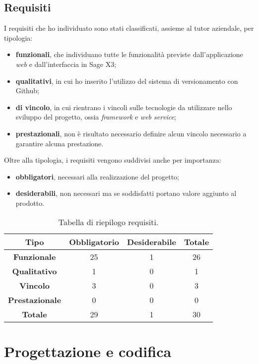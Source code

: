 \subsection{Requisiti}
I requisiti che ho individuato sono stati classificati, assieme al tutor aziendale, per tipologia:
\begin{itemize}
	\item \textbf{funzionali}, che individuano tutte le funzionalità previste dall'applicazione \textit{web} e dall'interfaccia in Sage X3;
	\item \textbf{qualitativi}, in cui ho inserito l'utilizzo del sistema di versionamento con Github;
	\item \textbf{di vincolo}, in cui rientrano i vincoli sulle tecnologie da utilizzare nello sviluppo del progetto, ossia \textit{framework} e \textit{web service}; 
	\item \textbf{prestazionali}, non è risultato necessario definire alcun vincolo necessario a garantire alcuna prestazione.
\end{itemize}
Oltre alla tipologia, i requisiti vengono suddivisi anche per importanza:
\begin{itemize}
	\item \textbf{obbligatori}, necessari alla realizzazione del progetto;
	\item \textbf{desiderabili}, non necessari ma se soddisfatti portano valore aggiunto al prodotto.
\end{itemize}


\begin{center}
\begin{longtable}{ | c| c | c | c|}
	\caption{Tabella di riepilogo requisiti.}\\
	\hline
	\textbf{Tipo} & \textbf{Obbligatorio} & \textbf{Desiderabile} & \textbf{Totale}\\
	\hline
	\textbf{Funzionale} & 25 & 1 & 26 \\
	\hline
	\textbf{Qualitativo} & 1 & 0 & 1\\
	\hline
	\textbf{Vincolo} & 3 & 0 & 3 \\
	\hline
	\textbf{Prestazionale} & 0 & 0 & 0 \\
	\hline
	\textbf{Totale} & 29 & 1 & 30 \\
	\hline
\end{longtable}
\end{center}




\section{Progettazione e codifica}

